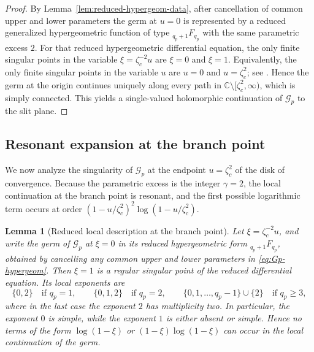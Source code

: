 \documentclass[11pt]{amsart}
\numberwithin{equation}{section}
\theoremstyle{plain}
\newtheorem{lemma}[theorem]{Lemma}
\theoremstyle{definition}
\theoremstyle{remark}
\newcommand{\CC}{\mathbb{C}}
\begin{document}
\begin{proof}
	By Lemma~\ref{lem:reduced-hypergeom-data}, after cancellation of common
	upper and lower parameters the germ at \(u=0\) is represented by a reduced
	generalized hypergeometric function of type \({}_{q_p+1}F_{q_p}\) with the
	same parametric excess \(2\). For that reduced hypergeometric differential
	equation, the only finite singular points in the variable
	\(\xi=\zeta_c^{-2}u\) are \(\xi=0\) and \(\xi=1\). Equivalently, the only
	finite singular points in the variable \(u\) are \(u=0\) and
	\(u=\zeta_c^2\); see \cite[\S16.8, \S16.11]{NIST:DLMF}. Hence the germ at
	the origin continues uniquely along every path in
	\(\CC\setminus[\zeta_c^2,\infty)\), which is simply connected. This yields
	a single-valued holomorphic continuation of \(\mathcal G_p\) to the slit
	plane.
\end{proof}


\subsection{Resonant expansion at the branch point}
\label{subsec:branch-point}

We now analyze the singularity of \(\mathcal G_p\) at the endpoint
\(u=\zeta_c^2\) of the disk of convergence. Because the parametric excess is
the integer \(\gamma=2\), the local continuation at the branch point is
resonant, and the first possible logarithmic term occurs at order
\((1-u/\zeta_c^2)^2\log(1-u/\zeta_c^2)\).


\begin{lemma}[Reduced local description at the branch point]
	\label{lem:xi-one-exponents}
	Let \(\xi=\zeta_c^{-2}u\), and write the germ of \(\mathcal G_p\) at
	\(\xi=0\) in its reduced hypergeometric form \({}_{q_p+1}F_{q_p}\),
	obtained by cancelling any common upper and lower parameters in
	\eqref{eq:Gp-hypergeom}. Then \(\xi=1\) is a regular singular point of the
	reduced differential equation. Its local exponents are
	\[
		\{0,2\}\quad\text{if }q_p=1,
		\qquad
		\{0,1,2\}\quad\text{if }q_p=2,
		\qquad
		\{0,1,\dots,q_p-1\}\cup\{2\}\quad\text{if }q_p\ge3,
	\]
	where in the last case the exponent \(2\) has multiplicity two. In
	particular, the exponent \(0\) is simple, while the exponent \(1\) is
	either absent or simple. Hence no terms of the form \(\log(1-\xi)\) or
	\((1-\xi)\log(1-\xi)\) can occur in the local continuation of the germ.
\end{lemma}
\end{document}
